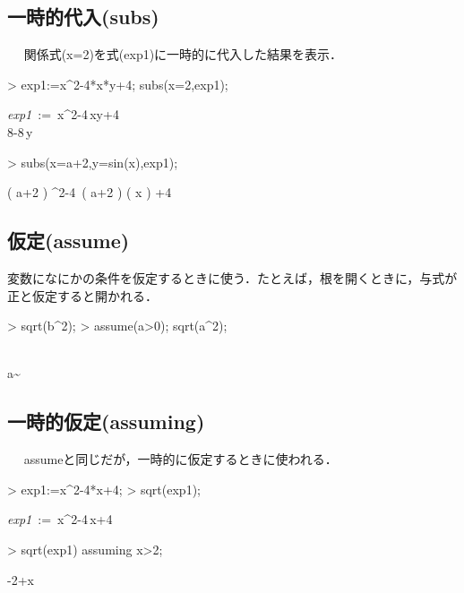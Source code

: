 \subsection{一時的代入(subs)}　
関係式(x=2)を式(exp1)に一時的に代入した結果を表示．
\begin{MapleInput}
> exp1:=x^2-4*x*y+4; subs(x=2,exp1);
\end{MapleInput}
\begin{MapleOutputGather}
{\it exp1}\, := \,{x}^{2}-4\,xy+4 \notag \\
8-8\,y \notag
\end{MapleOutputGather}
\begin{MapleInput}
> subs({x=a+2,y=sin(x)},exp1);
\end{MapleInput}
\begin{MapleOutput}
\left( a+2 \right) ^{2}-4\, \left( a+2 \right) \sin \left( x \right) +4
\end{MapleOutput}

\subsection{仮定(assume)}
変数になにかの条件を仮定するときに使う．たとえば，根を開くときに，与式が正と仮定すると開かれる．
\begin{MapleInput}
> sqrt(b^2); 
> assume(a>0); sqrt(a^2);
\end{MapleInput}
\begin{MapleOutputGather}
 \notag \\
a\sim \notag
\end{MapleOutputGather}

\subsection{一時的仮定(assuming)}　
assumeと同じだが，一時的に仮定するときに使われる．
\begin{MapleInput}
> exp1:=x^2-4*x+4; 
> sqrt(exp1);
\end{MapleInput}
\begin{MapleOutputGather}
{\it exp1}\, := \,{x}^{2}-4\,x+4 \notag \\
 \notag
\end{MapleOutputGather}

\begin{MapleInput}
> sqrt(exp1) assuming x>2;
\end{MapleInput}
\begin{MapleOutput}
-2+x
\end{MapleOutput}

